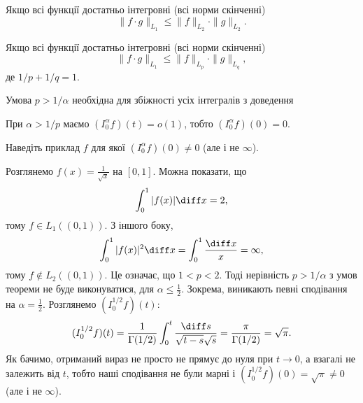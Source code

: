 \begin{remark}
    Якщо всі функції достатньо інтегровні (всі норми скінченні)
    \begin{equation}
        \|f \cdot g\|_{L_1} \le \|f\|_{L_2} \cdot \|g\|_{L_2}.  
    \end{equation}
\end{remark}

\begin{remark}
    Якщо всі функції достатньо інтегровні (всі норми скінченні)
    \begin{equation}
        \|f \cdot g\|_{L_1} \le \|f\|_{L_p} \cdot \|g\|_{L_q},  
    \end{equation}
    де $1 / p + 1 / q = 1$.
\end{remark}

\begin{remark}
    Умова $p > 1 / \alpha$ необхідна для збіжності усіх інтегралів з доведення
\end{remark}

\begin{corollary}
    При $\alpha > 1 / p$ маємо $(I_0^\alpha f)(t) = o(1)$, тобто $(I_0^\alpha f)(0) = 0$.
\end{corollary}

\begin{exercise}
    Наведіть приклад $f$ для якої $(I_0^\alpha f)(0) \ne 0$ (але і не $\infty$).
\end{exercise}
\begin{solution}
    \begin{example}
        Розглянемо $f(x) = \frac{1}{\sqrt{x}}$ на $[0,1]$. Можна показати, що
        \begin{equation}
            \int_0^1 |f(x)| \diff x = 2,
        \end{equation}
        тому $f \in L_1((0,1))$. З іншого боку,
        \begin{equation}
            \int_0^1 |f(x)|^2 \diff x = \int_0^1 \frac{\diff x}{x} = \infty,
        \end{equation}
        тому $f \not\in L_2((0,1))$. Це означає, що $1 < p < 2$. Тоді нерівність $p > 1 / \alpha$ з умов теореми не буде виконуватися, для $\alpha \le \frac{1}{2}$. Зокрема, виникають певні сподівання на $\alpha = \frac{1}{2}$. Розглянемо $(I_0^{1/2}f)(t)$:
        \begin{equation}
            (I_0^{1/2}f)(t) = \frac{1}{\Gamma(1/2)} \int_0^t \frac{\diff s}{\sqrt{t - s} \sqrt{s}} = \frac{\pi}{\Gamma(1/2)} = \sqrt{\pi}.
        \end{equation}
        Як бачимо, отриманий вираз не просто не прямує до нуля при $t \to 0$, а взагалі не залежить від $t$, тобто наші сподівання не були марні і $(I_0^{1/2}f)(0) = \sqrt{\pi} \ne 0$ (але і не $\infty$).
    \end{example}
\end{solution}


